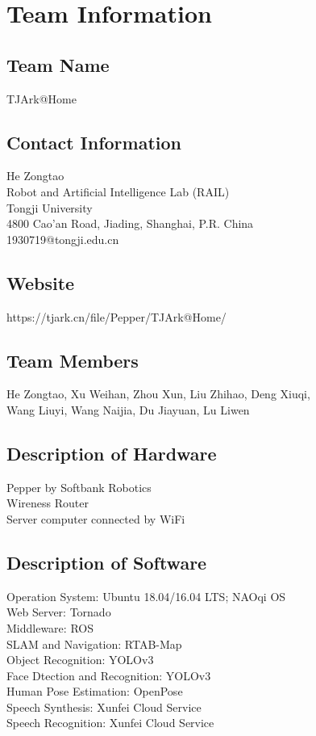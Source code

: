 \section{Team Information}
\label{sec:team}

\subsection*{Team Name}
TJArk@Home

\subsection*{Contact Information}
He Zongtao \\
Robot and Artificial Intelligence Lab (RAIL) \\
Tongji University \\
4800 Cao'an Road, Jiading, Shanghai, P.R. China \\
1930719@tongji.edu.cn 

\subsection*{Website}
https://tjark.cn/file/Pepper/TJArk@Home/

\subsection*{Team Members}
He Zongtao, Xu Weihan, Zhou Xun, Liu Zhihao, Deng Xiuqi, \\
Wang Liuyi, Wang Naijia, Du Jiayuan, Lu Liwen

\subsection*{Description of Hardware}
Pepper by Softbank Robotics \\
Wireness Router \\
Server computer connected by WiFi \\

\subsection*{Description of Software}
Operation System: Ubuntu 18.04/16.04 LTS; NAOqi OS \\
Web Server: Tornado \\
Middleware: ROS \\
SLAM and Navigation: RTAB-Map \\
Object Recognition: YOLOv3 \\
Face Dtection and Recognition: YOLOv3 \\
Human Pose Estimation:  OpenPose \\
Speech Synthesis: Xunfei Cloud Service\\
Speech Recognition: Xunfei Cloud Service \\